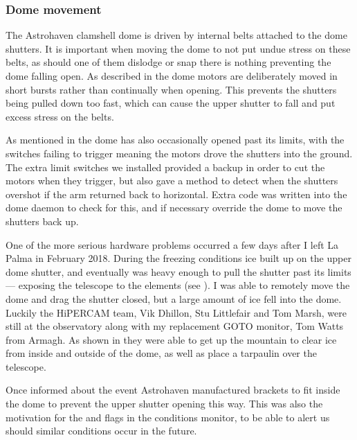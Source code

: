 \begin{colsection}
\begin{colsection}
\subsubsection{Dome movement}

The Astrohaven clamshell dome is driven by internal belts attached to the dome shutters. It is important when moving the dome to not put undue stress on these belts, as should one of them dislodge or snap there is nothing preventing the dome falling open. As described in  the dome motors are deliberately moved in short bursts rather than continually when opening. This prevents the shutters being pulled down too fast, which can cause the upper shutter to fall and put excess stress on the belts.

As mentioned in  the dome has also occasionally opened past its limits, with the switches failing to trigger meaning the motors drove the shutters into the ground. The extra limit switches we installed provided a backup in order to cut the motors when they trigger, but also gave a method to detect when the shutters overshot if the arm returned back to horizontal. Extra code was written into the dome daemon to check for this, and if necessary override the dome to move the shutters back up.

One of the more serious hardware problems occurred a few days after I left La Palma in February 2018. During the freezing conditions ice built up on the upper dome shutter, and eventually was heavy enough to pull the shutter past its limits --- exposing the telescope to the elements (see ). I was able to remotely move the dome and drag the shutter closed, but a large amount of ice fell into the dome. Luckily the HiPERCAM team, Vik Dhillon, Stu Littlefair and Tom Marsh, were still at the observatory along with my replacement GOTO monitor, Tom Watts from Armagh. As shown in  they were able to get up the mountain to clear ice from inside and outside of the dome, as well as place a tarpaulin over the telescope.

Once informed about the event Astrohaven manufactured brackets to fit inside the dome to prevent the upper shutter opening this way. This was also the motivation for the  and  flags in the conditions monitor, to be able to alert us should similar conditions occur in the future.


\end{colsection}
\end{colsection}
